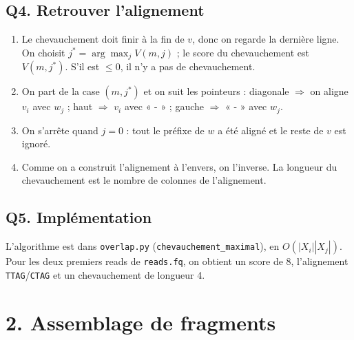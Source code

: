 \documentclass[11pt]{article}
\begin{document}
\subsection*{Q4. Retrouver l'alignement}
\begin{enumerate}
\item Le chevauchement doit finir à la fin de $v$, donc on regarde la dernière ligne. On choisit
$j^*=\arg\max_j V(m,j)$ ; le score du chevauchement est $V(m,j^*)$. S'il est $\le 0$, il n'y a pas de chevauchement.
\item On part de la case $(m,j^*)$ et on suit les pointeurs : diagonale $\Rightarrow$ on aligne $v_i$ avec $w_j$ ;
haut $\Rightarrow$ $v_i$ avec « - » ; gauche $\Rightarrow$ « - » avec $w_j$.
\item On s'arrête quand $j=0$ : tout le préfixe de $w$ a été aligné et le reste de $v$ est ignoré.
\item Comme on a construit l'alignement à l'envers, on l'inverse. La longueur du chevauchement est le nombre de
colonnes de l'alignement.
\end{enumerate}

\subsection*{Q5. Implémentation}
L'algorithme est dans \texttt{overlap.py} (\texttt{chevauchement\_maximal}), en $O(|X_i||X_j|)$.
Pour les deux premiers reads de \texttt{reads.fq}, on obtient un score de 8, l'alignement \texttt{TTAG}/\texttt{CTAG}
et un chevauchement de longueur 4.

\section*{2. Assemblage de fragments}
\end{document}
